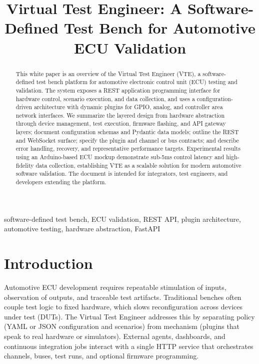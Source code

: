 \documentclass[conference]{IEEEtran}
\begin{document}
\title{Virtual Test Engineer: A Software-Defined Test Bench for Automotive ECU Validation}

\author{
}

\maketitle

\begin{abstract}
This white paper is an overview of the Virtual Test Engineer (VTE), a software-defined test bench platform for automotive electronic control unit (ECU) testing and validation. The system exposes a REST application programming interface for hardware control, scenario execution, and data collection, and uses a configuration-driven architecture with dynamic plugins for GPIO, analog, and controller area network interfaces. We summarize the layered design from hardware abstraction through device management, test execution, firmware flashing, and API gateway layers; document configuration schemas and Pydantic data models; outline the REST and WebSocket surface; specify the plugin and channel or bus contracts; and describe error handling, recovery, and representative performance targets. Experimental results using an Arduino-based ECU mockup demonstrate sub-5ms control latency and high-fidelity data collection, establishing VTE as a scalable solution for modern automotive software validation. The document is intended for integrators, test engineers, and developers extending the platform.
\end{abstract}

\begin{IEEEkeywords}
software-defined test bench, ECU validation, REST API, plugin architecture, automotive testing, hardware abstraction, FastAPI
\end{IEEEkeywords}

\section{Introduction}

Automotive ECU development requires repeatable stimulation of inputs, observation of outputs, and traceable test artifacts. Traditional benches often couple test logic to fixed hardware, which slows reconfiguration across devices under test (DUTs). The Virtual Test Engineer addresses this by separating policy (YAML or JSON configuration and scenarios) from mechanism (plugins that speak to real hardware or simulators). External agents, dashboards, and continuous integration jobs interact with a single HTTP service that orchestrates channels, buses, test runs, and optional firmware programming.
\end{document}
